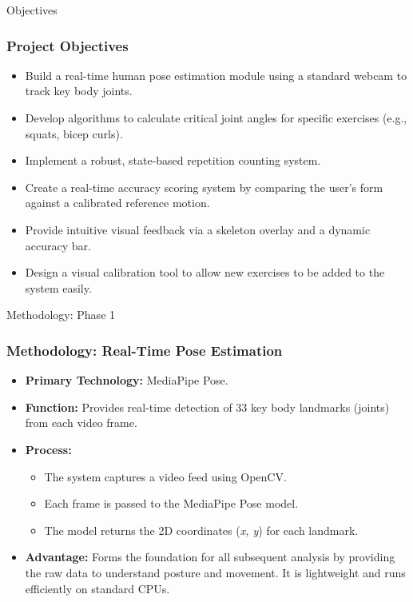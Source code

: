\documentclass[10pt]{beamer}
\begin{document}
\begin{frame}{Objectives}
    \frametitle{Project Objectives}
    \begin{itemize}
        \item Build a real-time human pose estimation module using a standard webcam to track key body joints.\vspace{0.5em}
        \item Develop algorithms to calculate critical joint angles for specific exercises (e.g., squats, bicep curls).\vspace{0.5em}
        \item Implement a robust, state-based repetition counting system.\vspace{0.5em}
        \item Create a real-time accuracy scoring system by comparing the user's form against a calibrated reference motion.\vspace{0.5em}
        \item Provide intuitive visual feedback via a skeleton overlay and a dynamic accuracy bar.\vspace{0.5em}
        \item Design a visual calibration tool to allow new exercises to be added to the system easily.
    \end{itemize}
\end{frame}


\begin{frame}{Methodology: Phase 1}
    \frametitle{Methodology: Real-Time Pose Estimation}
    \begin{itemize}
        \item \textbf{Primary Technology:} MediaPipe Pose.\vspace{0.5em}
        \item \textbf{Function:} Provides real-time detection of 33 key body landmarks (joints) from each video frame.\vspace{0.5em}
        \item \textbf{Process:}
        \begin{itemize}
            \item The system captures a video feed using OpenCV.
            \item Each frame is passed to the MediaPipe Pose model.
            \item The model returns the 2D coordinates (\textit{x, y}) for each landmark.
        \end{itemize}\vspace{0.5em}
        \item \textbf{Advantage:} Forms the foundation for all subsequent analysis by providing the raw data to understand posture and movement. It is lightweight and runs efficiently on standard CPUs.
    \end{itemize}
\end{frame}
\end{document}
